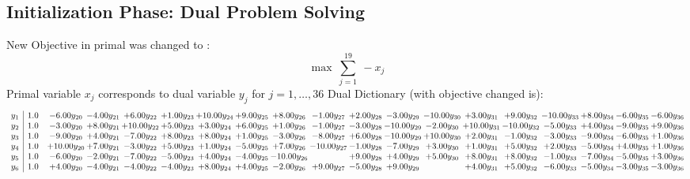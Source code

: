 \documentclass[9pt]{article}
\begin{document}
\subsection{Initialization Phase: Dual Problem Solving}
New Objective in primal was changed to : \[ \max\ \sum_{j=1}^{19}\ - x_j \] 
Primal variable $x_j$ corresponds to dual variable $y_j$ for $j = 1,\ldots,36$
Dual Dictionary (with objective changed is): 
\[\begin{array}{c| c c@{\hskip 2pt} c@{\hskip 2pt} c@{\hskip 2pt} c@{\hskip 2pt} c@{\hskip 2pt} c@{\hskip 2pt} c@{\hskip 2pt} c@{\hskip 2pt} c@{\hskip 2pt} c@{\hskip 2pt} c@{\hskip 2pt} c@{\hskip 2pt} c@{\hskip 2pt} c@{\hskip 2pt} c@{\hskip 2pt} c@{\hskip 2pt} c@{\hskip 2pt} }
 y_{1}   &  1.0 & -6.00 y_{20} & -4.00 y_{21} & +  6.00 y_{22} & +  1.00 y_{23} & + 10.00 y_{24} & +  9.00 y_{25} & +  8.00 y_{26} & -1.00 y_{27} & +  2.00 y_{28} & -3.00 y_{29} & -10.00 y_{30} & +  3.00 y_{31} & +  9.00 y_{32} & -10.00 y_{33} & +  8.00 y_{34} & -6.00 y_{35} & -6.00 y_{36}\\
 y_{2}   &  1.0 & -3.00 y_{20} & +  8.00 y_{21} & + 10.00 y_{22} & +  5.00 y_{23} & +  3.00 y_{24} & +  6.00 y_{25} & +  1.00 y_{26} & -1.00 y_{27} & -3.00 y_{28} & -10.00 y_{29} & -2.00 y_{30} & + 10.00 y_{31} & -10.00 y_{32} & -5.00 y_{33} & +  4.00 y_{34} & -9.00 y_{35} & +  9.00 y_{36}\\
 y_{3}   &  1.0 & -9.00 y_{20} & +  4.00 y_{21} & -7.00 y_{22} & +  8.00 y_{23} & +  8.00 y_{24} & +  1.00 y_{25} & -3.00 y_{26} & -8.00 y_{27} & +  6.00 y_{28} & -10.00 y_{29} & + 10.00 y_{30} & +  2.00 y_{31} & -1.00 y_{32} & -3.00 y_{33} & -9.00 y_{34} & -6.00 y_{35} & +  1.00 y_{36}\\
 y_{4}   &  1.0 & + 10.00 y_{20} & +  7.00 y_{21} & -3.00 y_{22} & +  5.00 y_{23} & +  1.00 y_{24} & -5.00 y_{25} & +  7.00 y_{26} & -10.00 y_{27} & -1.00 y_{28} & -7.00 y_{29} & +  3.00 y_{30} & +  1.00 y_{31} & +  5.00 y_{32} & +  2.00 y_{33} & -5.00 y_{34} & +  4.00 y_{35} & +  1.00 y_{36}\\
 y_{5}   &  1.0 & -6.00 y_{20} & -2.00 y_{21} & -7.00 y_{22} & -5.00 y_{23} & +  4.00 y_{24} & -4.00 y_{25} & -10.00 y_{26} &   & +  9.00 y_{28} & +  4.00 y_{29} & +  5.00 y_{30} & +  8.00 y_{31} & +  8.00 y_{32} & -1.00 y_{33} & -7.00 y_{34} & -5.00 y_{35} & +  3.00 y_{36}\\
 y_{6}   &  1.0 & +  4.00 y_{20} & -4.00 y_{21} & -4.00 y_{22} & -4.00 y_{23} & +  8.00 y_{24} & +  4.00 y_{25} & -2.00 y_{26} & +  9.00 y_{27} & -5.00 y_{28} & +  9.00 y_{29} &   & +  4.00 y_{31} & +  5.00 y_{32} & -6.00 y_{33} & -5.00 y_{34} & -3.00 y_{35} & -3.00 y_{36}\\

\end{array}\]
\end{document}
